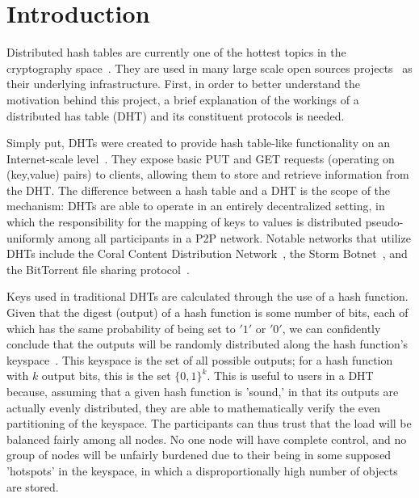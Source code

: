 \documentclass[12pt]{article}
\begin{document}
\section{Introduction}
\par Distributed hash tables are currently one of the hottest topics in the cryptography space~\cite{Stoica:2001dj,Rowstron:2001ea,Ratnasamy:2001wn}. They are used in many large scale open sources projects~\cite{Freitas:2013tb,Xu:2010vs,Perfitt:2010fh} as their underlying infrastructure. First, in order to better understand the motivation behind this project, a brief explanation of the workings of a distributed has table (DHT) and its constituent protocols is needed.

\par Simply put, DHTs were created to provide hash table-like functionality on an Internet-scale level~\cite{Ratnasamy:2001wn}. They expose basic PUT and GET requests (operating on (key,value) pairs) to clients, allowing them to store and retrieve information from the DHT. The difference between a hash table and a DHT is the scope of the mechanism: DHTs are able to operate in an entirely decentralized setting, in which the responsibility for the mapping of keys to values is distributed pseudo-uniformly among all participants in a P2P network. Notable networks that utilize DHTs include the Coral Content Distribution Network~\cite{Freedman:2004vb}, the Storm Botnet~\cite{Holz:2008uk}, and the BitTorrent file sharing protocol~\cite{Cohen:y1_8mBnw}.

\par Keys used in traditional DHTs are calculated through the use of a hash function. Given that the digest (output) of a hash function is some number of bits, each of which has the same probability of being set to $'1'$ or $'0'$, we can confidently conclude that the outputs will be randomly distributed along the hash function's keyspace~. This keyspace is the set of all possible outputs; for a hash function with $k$ output bits, this is the set $\{0,1\}^k$. This is useful to users in a DHT because, assuming that a given hash function is 'sound,' in that its outputs are actually evenly distributed, they are able to mathematically verify the even partitioning of the keyspace. The participants can thus trust that the load will be balanced fairly among all nodes. No one node will have complete control, and no group of nodes will be unfairly burdened due to their being in some supposed 'hotspots' in the keyspace, in which a disproportionally high number of objects are stored.~
\end{document}
